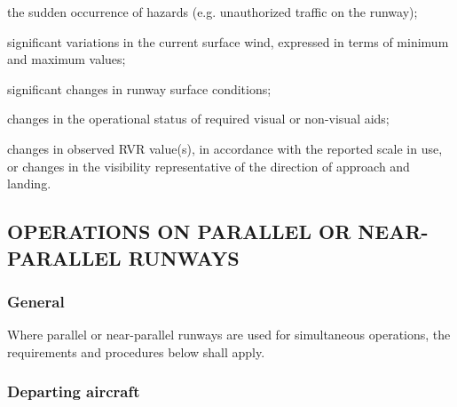 \begin{enumnoss}
    \begin{enumalph}
        \item the sudden occurrence of hazards (e.g. unauthorized traffic on the runway);
        \item significant variations in the current surface wind, expressed in terms of minimum and maximum values;
        \item significant changes in runway surface conditions;
        \item changes in the operational status of required visual or non-visual aids;
        \item changes in observed RVR value(s), in accordance with the reported scale in use, or changes in the visibility representative of the direction of approach and landing.
    \end{enumalph}
\end{enumnoss}

\subsection[Operations on parallel or near-parallel runways]{OPERATIONS ON PARALLEL OR NEAR-PARALLEL RUNWAYS}

\subsubsection{General}

Where parallel or near-parallel runways are used for simultaneous operations, the requirements and procedures below shall apply.

\subsubsection{Departing aircraft}

